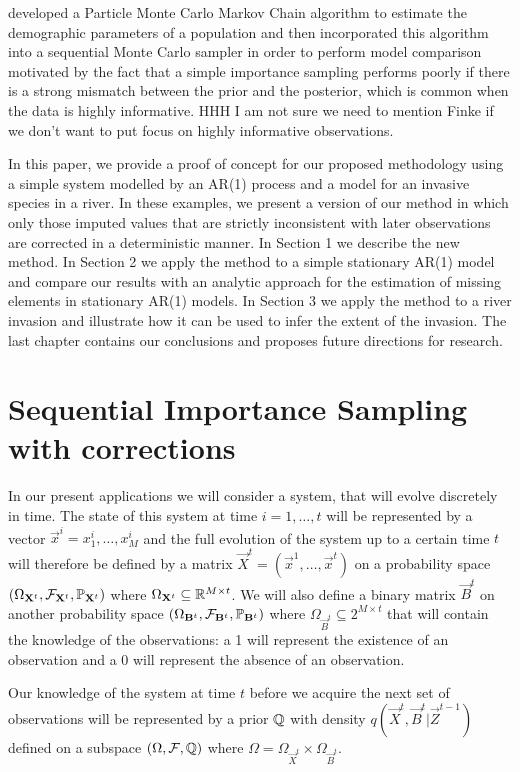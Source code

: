 \cite{Finke} developed a Particle Monte Carlo Markov Chain algorithm to estimate the demographic parameters of a population and then incorporated this algorithm into a sequential Monte Carlo sampler in order to perform model comparison motivated by the fact that a simple importance sampling performs poorly if there is a strong mismatch between the prior and the posterior, which is common when the data is highly informative. {\color{blue}HHH I am not sure we need to mention Finke if we don't want to put focus on highly informative observations.}

In this paper, we provide a proof of concept for our proposed methodology using a simple system modelled by an AR(1) process and a model for an invasive species in a river. In these examples, we present a version of our method in which only those imputed values that are strictly inconsistent with later observations are corrected in a deterministic manner. 
In Section 1 we describe the new method. In Section 2 we apply the method to a simple stationary AR(1) model and compare our results with an analytic approach for the estimation of missing elements in stationary AR(1) models.
In Section 3 we apply the method to a river invasion and illustrate how it can be used to infer the extent of the invasion.
The last chapter contains our conclusions and proposes future directions for research.

\section{Sequential Importance Sampling with corrections}
\label{sec:2}

In our present applications we will consider a system, that will evolve discretely in time. The state of this system at time $i = 1, \dots, t$ will be represented by a vector $\vec{x}^i = x^i_1, \dots, x^i_M$ and the full evolution of the system up to a certain time $t$ will therefore be defined by a matrix $\vec{X}^{t} = (\vec{x}^1, \dots, \vec{x}^{t})$ on a probability space $(\Omega_{\mathbf{X}^t}, \mathcal{F}_{\mathbf{X}^t}, \mathbb{P}_{\mathbf{X}^t})$ where $\Omega_{\mathbf{X}^t} \subseteq \mathbb R^{M \times t}$. We will also define a binary matrix $\vec{B}^t$ on another probability space $(\Omega_{\mathbf{B}^t}, \mathcal{F}_{\mathbf{B}^t}, \mathbb{P}_{\mathbf{B}^t})$ where $\Omega_{\vec{B}^t} \subseteq 2^{M \times t}$ that will contain the knowledge of the observations: a 1 will represent the existence of an observation and a 0 will represent the absence of an observation. 

Our knowledge of the system at time $t$ before we acquire the next set of observations will be represented by a prior $\mathbb{Q}$ with density $q(\vec{X}^t, \vec{B}^t | \vec{Z}^{t-1})$ defined on a subspace $(\Omega, \mathcal{F}, \mathbb{Q})$ where $\Omega = \Omega_{\vec{X}^t} \times \Omega_{\vec{B}^t}$.

